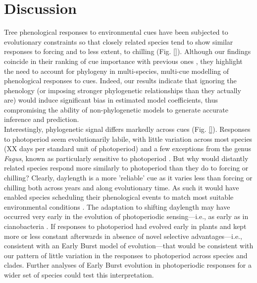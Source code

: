 \documentclass{article}\usepackage[]{graphicx}\usepackage[]{color}
\begin{document}







\section*{Discussion}

Tree phenological responses to environmental cues have been subjected to evolutionary constraints so that closely related species tend to show similar responses to forcing and to less extent, to chilling (Fig. \ref{}). Although our findings coincide in their ranking of cue importance with previous ones \citep{ettinger2020}, they highlight the need to account for phylogeny in multi-species, multi-cue modelling of phenological responses to cues. Indeed, our results indicate that ignoring the phenology (or imposing stronger phylogenetic relationships than they actually are) would induce significant bias in estimated model coefficients, thus compromising the ability of non-phylogenetic models to generate accurate inference and prediction.\\ 

Interestingly, phylogenetic signal differs markedly across cues (Fig. \ref{}). Responses to photoperiod seem evolutionarily labile, with little variation across most species (XX days per standard unit of photoperiod) and a few exceptions from the genus \emph{Fagus}, known as particularly sensitive to photoperiod \citep{fu2019}. But why would distantly related species respond more similarly to photoperiod than they do to forcing or chilling? Clearly, daylength is a more 'reliable' cue as it varies less than forcing or chilling both across years and along evolutionary time. As such it would have enabled species scheduling their phenological events to match most suitable environmental conditions \citep{jackson2009plant}. The adaptation to shifting daylength may have occurred very early in the evolution of photoperiodic sensing---i.e., as early as in cianobacteria \citep{hut2011evolution, serrano2017evolution}. If responses to photoperiod had evolved early in plants and kept more or less constant afterwards in absence of novel selective advantages---i.e., consistent with an Early Burst model of evolution---that would be consistent with our pattern of little variation in the responses to photoperiod across species and clades. Further analyses of Early Burst evolution in photoperiodic responses for a wider set of species could test this interpretation.   
\end{document}
